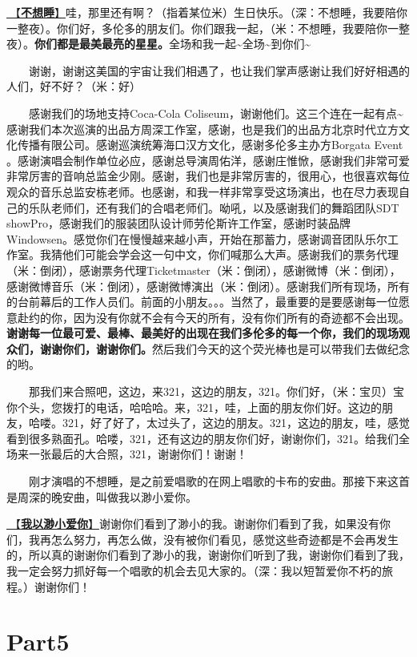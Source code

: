\documentclass[]{ctexbook}
\begin{document}
\hyperref[donot-want-to-sleep]{🎵【\textbf{不想睡}】}哇，那里还有啊？（指着某位米）生日快乐。（深：不想睡，我要陪你一整夜）。你们好，多伦多的朋友们。你们跟我一起，（米：不想睡，我要陪你一整夜）。\textbf{你们都是最美最亮的星星。}全场和我一起\textasciitilde 全场\textasciitilde 到你们\textasciitilde{}

  谢谢，谢谢这美国的宇宙让我们相遇了，也让我们掌声感谢让我们好好相遇的人们，好不好？（米：好）

  感谢我们的场地支持Coca-Cola Coliseum，谢谢他们。这三个连在一起有点\textasciitilde 感谢我们本次巡演的出品方周深工作室，感谢，也是我们的出品方北京时代立方文化传播有限公司。感谢巡演统筹海口汉方文化，感谢多伦多主办方Borgata Event 。感谢演唱会制作单位必应，感谢总导演周佑洋，感谢庄惟惞，感谢我们非常可爱非常厉害的音响总监金少刚。感谢，我们也是非常厉害的，很用心，也很喜欢每位观众的音乐总监安栋老师。也感谢，和我一样非常享受这场演出，也在尽力表现自己的乐队老师们，还有我们的合唱老师们。呦吼，以及感谢我们的舞蹈团队SDT showPro，感谢我们的服装团队设计师劳伦斯许工作室，感谢时装品牌Windowsen。感觉你们在慢慢越来越小声，开始在那蓄力，感谢调音团队乐尔工作室。我猜他们可能会学会这一句中文，你们喊那么大声。感谢我们的票务代理（米：倒闭），感谢票务代理Ticketmaster（米：倒闭），感谢微博（米：倒闭），感谢微博音乐（米：倒闭），感谢微博演出（米：倒闭）。感谢我们所有现场，所有的台前幕后的工作人员们。前面的小朋友。。。当然了，最重要的是要感谢每一位愿意赴约的你，因为没有你就不会有今天的所有，没有你们所有的奇迹都不会出现。\textbf{谢谢每一位最可爱、最棒、最美好的出现在我们多伦多的每一个你，我们的现场观众们，谢谢你们，谢谢你们。}然后我们今天的这个荧光棒也是可以带我们去做纪念的哟。

  那我们来合照吧，这边，来321，这边的朋友，321。你们好，（米：宝贝）宝你个头，您拨打的电话，哈哈哈。来，321，哇，上面的朋友你们好。这边的朋友，哈喽。321，好了好了，太过头了，这边的朋友。321，这边的朋友，哇，感觉看到很多熟面孔。哈喽，321，还有这边的朋友你们好，谢谢你们，321。给我们全场来一张最后的大合照，321，谢谢你们！谢谢！

  刚才演唱的不想睡，是之前爱唱歌的在网上唱歌的卡布的安曲。那接下来这首是周深的晚安曲，叫做我以渺小爱你。

\hyperref[loving-you-in-my-humble-way]{🎵【\textbf{我以渺小爱你}】}谢谢你们看到了渺小的我。谢谢你们看到了我，如果没有你们，我再怎么努力，再怎么做，没有被你们看见，感觉这些奇迹都是不会再发生的，所以真的谢谢你们看到了渺小的我，谢谢你们听到了我，谢谢你们看到了我，我一定会努力抓好每一个唱歌的机会去见大家的。（深：我以短暂爱你不朽的旅程。）谢谢你们！

\section{Part5}\label{Toronto-20250314-part5}
\end{document}
